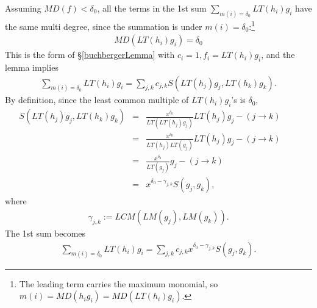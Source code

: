 \documentclass[11pt]{book}
\begin{document}
Assuming $MD(f) < \delta_0$, all the terms in the 1st sum $\sum_{m(i) = \delta_0} LT(h_i) g_i $ have the same multi degree, since the summation is under $m(i) = \delta_0$:\footnote{The leading term carries the maximum monomial, so $m(i) = MD(h_i g_i) = MD\left( LT(h_i) g_i  \right)$.}
\begin{eqnarray}
MD\left( LT(h_i) g_i  \right) = \delta_0
\end{eqnarray}
This is the form of \S\ref{buchbergerLemma} with $c_i =1, f_i = LT(h_i) g_i$, and the lemma implies
\begin{eqnarray}
\sum_{m(i) = \delta_0} LT(h_i) g_i = \sum_{j,k}c_{j,k} S\left(LT(h_j) g_j, LT(h_k) g_k \right).
\end{eqnarray}
By definition, since the least common multiple of $LT(h_i) g_i$'s is $\delta_0$, 
\begin{eqnarray}
S\left(LT(h_j) g_j, LT(h_k) g_k \right) &=& \frac{x^{\delta_0}}{LT\left(LT(h_j) g_j \right)}LT(h_j) g_j - (j\to k) \qquad \\
&=& \frac{x^{\delta_0}}{LT(h_j) LT\left( g_j \right)}LT(h_j) g_j - (j\to k) \\
&=& \frac{x^{\delta_0}}{LT\left( g_j \right)} g_j - (j\to k) \\
&=& x^{\delta_0 - \gamma_{j,k}} S(g_j, g_k),
\end{eqnarray}
where
\begin{eqnarray}
\gamma_{j,k} := LCM\left(LM(g_j), LM(g_k) \right).
\end{eqnarray}
The 1st sum becomes
\begin{eqnarray}
\label{semiFinalResult}
\sum_{m(i) = \delta_0} LT(h_i) g_i = \sum_{j,k}c_{j,k} x^{\delta_0 - \gamma_{j,k}} S(g_j, g_k).
\end{eqnarray}
\end{document}
